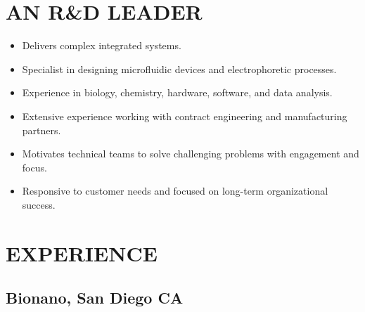 \documentclass{res}
\begin{document}

\address{5210 Fiore Terrace L205 \\ San Diego, CA 92122 \\ (650) 391-8463}

\address{Citizenship: United States \\ \\ lewis.a.marshall@gmail.com}

\begin{resume}

\section{AN R\&D LEADER}
  \begin{itemize}
    \item Delivers complex integrated systems.
    \item Specialist in designing microfluidic devices and electrophoretic processes.
    \item Experience in biology, chemistry, hardware, software, and data analysis.
    \item Extensive experience working with contract engineering and manufacturing partners.
    \item Motivates technical teams to solve challenging problems with engagement and focus.
    \item Responsive to customer needs and focused on long-term organizational success.
  \end{itemize}



\section{EXPERIENCE}
\vspace{-0.1in}


   \subsection{Bionano, San Diego CA}
    \vspace{-0.1in}

\end{resume}
\end{document}
